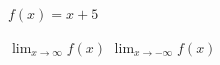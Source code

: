\noindent\begin{minipage}[t]{0.58\linewidth}\vspace{0pt}\raggedright $f(x)=x+5$\end{minipage}\hfill\begin{minipage}[t]{0.4\linewidth}\vspace{0pt}\centering \resizebox{\ifdim\width>\linewidth\linewidth\else\width\fi}{!}{}\end{minipage}\par
{} $\displaystyle\lim_{x\to\infty} f(x)$
 $\displaystyle\lim_{x\to-\infty} f(x)$
